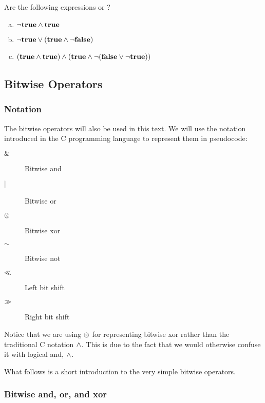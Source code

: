 \begin{Exercise}[label={boolean}]
  Are the following expressions \True or \False?

  \begin{enumerate}[(a)]
  \item $\neg \textbf{true} \wedge \textbf{true}$
  \item $\neg \textbf{true} \vee (\textbf{true} \wedge \neg \textbf{false})$

  \item $(\textbf{true} \wedge \textbf{true}) \wedge (\textbf{true} \wedge \neg(\textbf{false} \vee \neg \textbf{true}))$

  \end{enumerate}
\end{Exercise}

\subsection{Bitwise Operators}
\label{sec:bitwise-operators}

\subsubsection{Notation}

The bitwise operators will also be used in this text. We will use the
notation introduced in the C programming language\cite{kernighan1988c}
to represent them in pseudocode:


\begin{samepage}
  \begin{description}
  \item[$\mathrel{\&}$] Bitwise and
  \item[$\mathrel{|}$] Bitwise or
  \item[$\mathrel{\otimes}$] Bitwise xor
  \item[$\mathord{\sim}$] Bitwise not
  \item[$\ll$] Left bit shift
  \item[$\gg$] Right bit shift
  \end{description}
\end{samepage}
Notice that we are using $\mathrel{\otimes}$ for representing bitwise
xor rather than the traditional C notation $\wedge$. This is due to
the fact that we would otherwise confuse it with logical and, $\wedge$.

What follows is a short introduction to the very simple bitwise
operators.

\subsubsection{Bitwise and, or, and xor}

